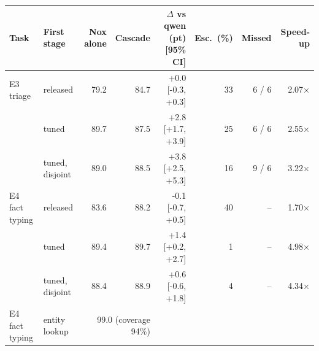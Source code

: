 \begin{tabular}{llrrrrrr}
\toprule
Task & First stage & Nox alone & Cascade & $\Delta$ vs qwen (pt) [95\% CI] & Esc.\ (\%) & Missed & Speed-up \\
\midrule
E3 triage & released & 79.2 & 84.7 & +0.0 [-0.3, +0.3] & 33 & 6 / 6 & 2.07$\times$ \\
 & tuned & 89.7 & 87.5 & +2.8 [+1.7, +3.9] & 25 & 6 / 6 & 2.55$\times$ \\
 & tuned, disjoint & 89.0 & 88.5 & +3.8 [+2.5, +5.3] & 16 & 9 / 6 & 3.22$\times$ \\
\midrule
E4 fact typing & released & 83.6 & 88.2 & -0.1 [-0.7, +0.5] & 40 & -- & 1.70$\times$ \\
 & tuned & 89.4 & 89.7 & +1.4 [+0.2, +2.7] & 1 & -- & 4.98$\times$ \\
 & tuned, disjoint & 88.4 & 88.9 & +0.6 [-0.6, +1.8] & 4 & -- & 4.34$\times$ \\
E4 fact typing & entity lookup & \multicolumn{2}{r}{99.0 (coverage 94\%)} & & & & \\
\bottomrule
\end{tabular}
